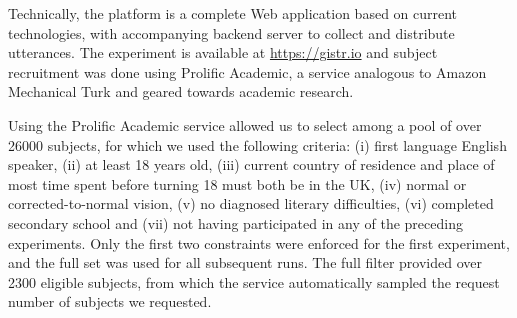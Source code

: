Technically, the platform is a complete Web application based on current
technologies, with accompanying backend server to collect and distribute
utterances.
The experiment is available at \url{https://gistr.io} and subject
recruitment was done using Prolific Academic, a service analogous to
Amazon Mechanical Turk and geared towards academic research.

Using the Prolific Academic service allowed us to select among a pool of
over \num{26000} subjects, for which we used the following criteria: (i) first language English speaker, (ii) at least 18 years old, (iii) current country of residence and place of most time spent before
  turning 18 must both be in the UK, (iv) normal or corrected-to-normal vision, (v) no diagnosed literary difficulties, (vi) completed secondary school and (vii) not having participated in any of the preceding experiments.
Only the first two constraints were enforced for the first experiment,
and the full set was used for all subsequent runs. The full filter
provided over \num{2300} eligible subjects, from which the service
automatically sampled the request number of subjects we requested.

